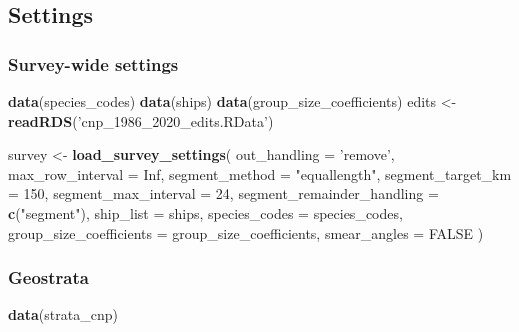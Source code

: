 \documentclass[
]{book}
\newenvironment{Shaded}{\begin{snugshade}}{\end{snugshade}}
\newcommand{\DataTypeTok}[1]{\textcolor[rgb]{0.13,0.29,0.53}{#1}}
\newcommand{\DecValTok}[1]{\textcolor[rgb]{0.00,0.00,0.81}{#1}}
\newcommand{\KeywordTok}[1]{\textcolor[rgb]{0.13,0.29,0.53}{\textbf{#1}}}
\newcommand{\NormalTok}[1]{#1}
\newcommand{\OtherTok}[1]{\textcolor[rgb]{0.56,0.35,0.01}{#1}}
\newcommand{\StringTok}[1]{\textcolor[rgb]{0.31,0.60,0.02}{#1}}
\begin{document}
\hypertarget{settings-2}{%
\subsection*{Settings}\label{settings-2}}

\hypertarget{survey-wide-settings-3}{%
\subsubsection*{Survey-wide settings}\label{survey-wide-settings-3}}

\begin{Shaded}
\begin{Highlighting}[]
\KeywordTok{data}\NormalTok{(species_codes)}
\KeywordTok{data}\NormalTok{(ships)}
\KeywordTok{data}\NormalTok{(group_size_coefficients)}
\NormalTok{edits <-}\StringTok{ }\KeywordTok{readRDS}\NormalTok{(}\StringTok{'cnp_1986_2020_edits.RData'}\NormalTok{)}

\NormalTok{survey <-}\StringTok{ }\KeywordTok{load_survey_settings}\NormalTok{(}
  \DataTypeTok{out_handling =} \StringTok{'remove'}\NormalTok{,}
  \DataTypeTok{max_row_interval =} \OtherTok{Inf}\NormalTok{,}
  \DataTypeTok{segment_method =} \StringTok{"equallength"}\NormalTok{,}
  \DataTypeTok{segment_target_km =} \DecValTok{150}\NormalTok{,}
  \DataTypeTok{segment_max_interval =} \DecValTok{24}\NormalTok{,}
  \DataTypeTok{segment_remainder_handling =} \KeywordTok{c}\NormalTok{(}\StringTok{"segment"}\NormalTok{),}
  \DataTypeTok{ship_list =}\NormalTok{ ships,}
  \DataTypeTok{species_codes =}\NormalTok{ species_codes,}
  \DataTypeTok{group_size_coefficients =}\NormalTok{ group_size_coefficients,}
  \DataTypeTok{smear_angles =} \OtherTok{FALSE}
\NormalTok{)}
\end{Highlighting}
\end{Shaded}

\hypertarget{geostrata-2}{%
\subsubsection*{Geostrata}\label{geostrata-2}}

\begin{Shaded}
\begin{Highlighting}[]
\KeywordTok{data}\NormalTok{(strata_cnp)}
\end{Highlighting}
\end{Shaded}
\end{document}
